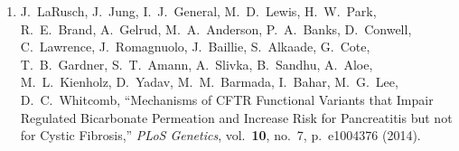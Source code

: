 \begin{enumerate}
\item J.\ LaRusch, J.\ Jung, I.\ J.\ General, M.\ D.\ Lewis, H.\ W.\ Park, R.\ E.\ Brand, A.\ Gelrud, M.\ A.\ Anderson, P.\ A.\ Banks, D.\ Conwell,   C.\ Lawrence, J.\ Romagnuolo, J.\ Baillie, S.\ Alkaade, G.\ Cote, T.\ B.\ Gardner, S.\ T.\ Amann, A.\ Slivka, B.\ Sandhu, A.\ Aloe, M.\ L.\ Kienholz, D.\ Yadav, M.\ M.\ Barmada, I.\ Bahar, M.\ G.\ Lee, D.\ C.\ Whitcomb, ``Mechanisms of CFTR Functional Variants that Impair Regulated Bicarbonate Permeation and Increase Risk for Pancreatitis but not for Cystic Fibrosis,'' \textit{PLoS Genetics}, vol.\ \textbf{10}, no.\ 7, p.\ e1004376 (2014).

\end{enumerate}



